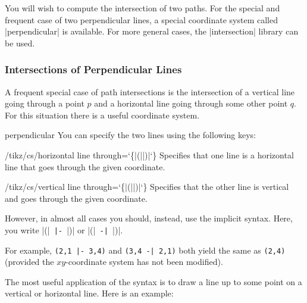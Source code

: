 You will wish to compute the intersection of two paths. For the special and
frequent case of two perpendicular lines, a special coordinate system called
|perpendicular| is available. For more general cases, the |intersection|
library can be used.


\subsubsection{Intersections of Perpendicular Lines}

A frequent special case of path intersections is the intersection of a vertical
line going through a point $p$ and a horizontal line going through some other
point $q$. For this situation there is a useful coordinate system.

\begin{coordinatesystem}{perpendicular}
    You can specify the two lines using the following keys:

    \begin{key}{/tikz/cs/horizontal line through={\ttfamily\char`\{}|(||)|{\ttfamily\char`\}}}
        Specifies that one line is a horizontal line that goes through the
        given coordinate.
    \end{key}
    \begin{key}{/tikz/cs/vertical line through={\ttfamily\char`\{}|(||)|{\ttfamily\char`\}}}
        Specifies that the other line is vertical and goes through the given
        coordinate.
    \end{key}

    However, in almost all cases you should, instead, use the implicit syntax.
    Here, you write 
    |(|\verb! |- !|)| or
    |(|\verb! -| !|)|.

    For example, \verb!(2,1 |- 3,4)! and  \verb!(3,4 -| 2,1)! both yield the
    same as \verb!(2,4)! (provided the $xy$-co\-or\-di\-nate system has not
    been modified).

    The most useful application of the syntax is to draw a line up to some
    point on a vertical or horizontal line. Here is an example:
\begin{codeexample}[]
\end{codeexample}
\end{coordinatesystem}
